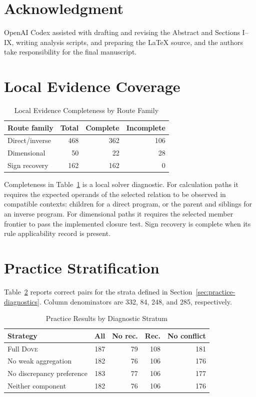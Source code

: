 \documentclass[conference]{IEEEtran}
\newcommand{\dove}{\textsc{Dove}}
\begin{document}
\section*{Acknowledgment}
OpenAI Codex assisted with drafting and revising the Abstract and Sections I--IX, writing analysis scripts, and preparing the \LaTeX{} source, and the authors take responsibility for the final manuscript.

\appendices

\section{Local Evidence Coverage}
\label{app:coverage}

\begin{table}[h]
\caption{Local Evidence Completeness by Route Family}
\label{tab:coverage}
\centering
\small
\begin{tabular}{lrrr}
\toprule
Route family & Total & Complete & Incomplete \\
\midrule
Direct/inverse & 468 & 362 & 106 \\
Dimensional & 50 & 22 & 28 \\
Sign recovery & 162 & 162 & 0 \\
\bottomrule
\end{tabular}
\end{table}

Completeness in Table~\ref{tab:coverage} is a local solver diagnostic. For calculation paths it requires the expected operands of the selected relation to be observed in compatible contexts: children for a direct program, or the parent and siblings for an inverse program. For dimensional paths it requires the selected member frontier to pass the implemented closure test. Sign recovery is complete when its rule applicability record is present.

\section{Practice Stratification}
\label{app:strata}

Table~\ref{tab:strata} reports correct pairs for the strata defined in Section~\ref{sec:practice-diagnostics}. Column denominators are 332, 84, 248, and 285, respectively.

\begin{table}[h]
\caption{Practice Results by Diagnostic Stratum}
\label{tab:strata}
\centering
\scriptsize
\setlength{\tabcolsep}{3.0pt}
\begin{tabular}{lrrrr}
\toprule
Strategy & All & No rec. & Rec. & No conflict \\
\midrule
Full \dove{} & 187 & 79 & 108 & 181 \\
No weak aggregation & 182 & 76 & 106 & 176 \\
No discrepancy preference & 183 & 77 & 106 & 177 \\
Neither component & 182 & 76 & 106 & 176 \\
\bottomrule
\end{tabular}
\end{table}



\end{document}
